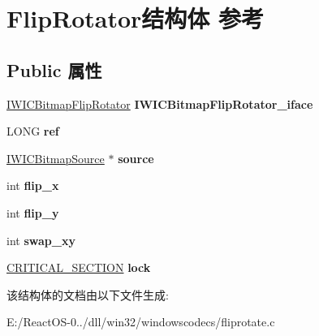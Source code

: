 \hypertarget{struct_flip_rotator}{}\section{Flip\+Rotator结构体 参考}
\label{struct_flip_rotator}
\subsection*{Public 属性}
\begin{DoxyCompactItemize}
\item 
\mbox{\label{struct_flip_rotator_aec3dcd6a2387d47a66ee90f512eca082}} 
\hyperlink{interface_i_w_i_c_bitmap_flip_rotator}{I\+W\+I\+C\+Bitmap\+Flip\+Rotator} {\bfseries I\+W\+I\+C\+Bitmap\+Flip\+Rotator\+\_\+iface}
\item 
\mbox{\label{struct_flip_rotator_ab124004d82affbe7b9c6c6b8a778e1f1}} 
L\+O\+NG {\bfseries ref}
\item 
\mbox{\label{struct_flip_rotator_a5a57eb808bd0605aa0028fd39ac5a159}} 
\hyperlink{interface_i_w_i_c_bitmap_source}{I\+W\+I\+C\+Bitmap\+Source} $\ast$ {\bfseries source}
\item 
\mbox{\label{struct_flip_rotator_a7ec9f2bee76f375195dc82dca12956c1}} 
int {\bfseries flip\+\_\+x}
\item 
\mbox{\label{struct_flip_rotator_a8174b43491747603aa1883f47dfeb7d9}} 
int {\bfseries flip\+\_\+y}
\item 
\mbox{\label{struct_flip_rotator_a6cf9c49c32c1c59e7d36e54edbc94046}} 
int {\bfseries swap\+\_\+xy}
\item 
\mbox{\label{struct_flip_rotator_afafe3ffec490a3ed4f5df88a6eda49de}} 
\hyperlink{struct___c_r_i_t_i_c_a_l___s_e_c_t_i_o_n}{C\+R\+I\+T\+I\+C\+A\+L\+\_\+\+S\+E\+C\+T\+I\+ON} {\bfseries lock}
\end{DoxyCompactItemize}


该结构体的文档由以下文件生成\+:\begin{DoxyCompactItemize}
\item 
E\+:/\+React\+O\+S-\/0../dll/win32/windowscodecs/fliprotate.\+c\end{DoxyCompactItemize}

